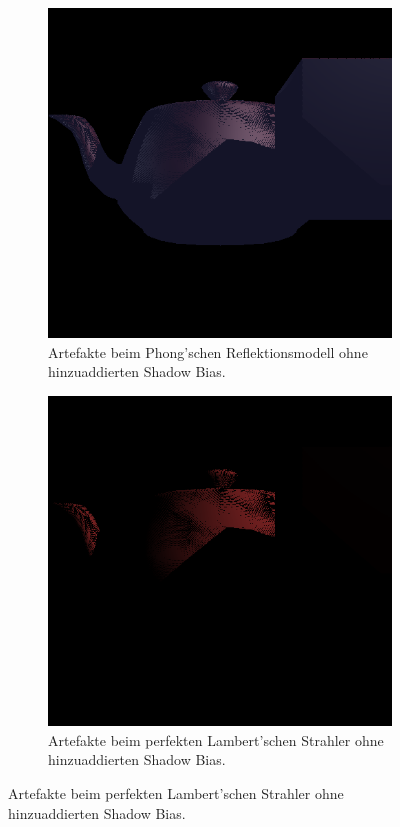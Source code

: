 \documentclass{article} %
\begin{document}
\begin{figure}[H]
     \centering
     \begin{subfigure}[b]{0.4\textwidth}
         \centering
         \includegraphics[width=\textwidth]{phong.png}
         \caption{Artefakte beim Phong'schen Reflektionsmodell ohne hinzuaddierten Shadow Bias.}
         \label{fig:y equals x}
     \end{subfigure}
     \hfill
     \begin{subfigure}[b]{0.4\textwidth}
         \centering
         \includegraphics[width=\textwidth]{reflectance.png}
         \caption{Artefakte beim perfekten Lambert'schen Strahler ohne hinzuaddierten Shadow Bias.}
         \label{fig:three sin x}
     \end{subfigure}
\end{figure}
\end{document}

